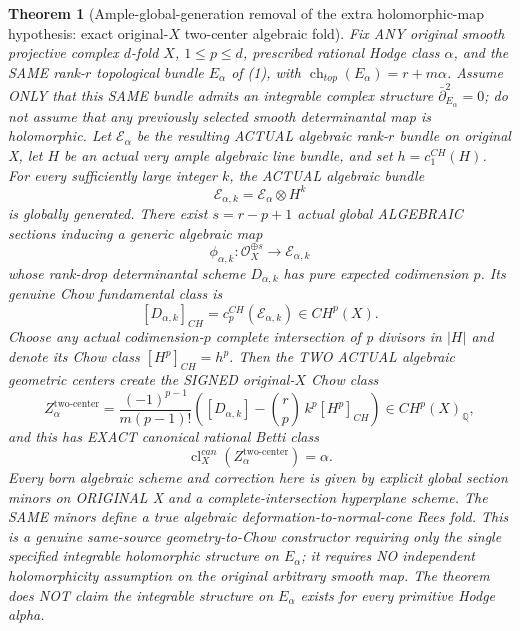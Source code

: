 \documentclass[11pt]{article}
\newtheorem{theorem}{Theorem}
\begin{document}
\begin{theorem}[Ample-global-generation removal of the extra holomorphic-map hypothesis: exact original-$X$ two-center algebraic fold]
Fix ANY original smooth projective
complex $d$-fold $X$, $1\le p\le d$,
prescribed rational Hodge class
$\alpha$, and the SAME rank-$r$
topological bundle $E_\alpha$
of (1), with
$\operatorname{ch}_{top}(E_\alpha)
=r+m\alpha$.
Assume ONLY that this SAME
bundle admits an integrable
complex structure
$\bar\partial_{E_\alpha}^2=0$;
do not assume that any
previously selected smooth
determinantal map is holomorphic.
Let $\mathcal E_\alpha$ be the
resulting ACTUAL algebraic
rank-$r$ bundle on original X,
let $H$ be an actual very
ample algebraic line bundle,
and set $h=c_1^{CH}(H)$.
For every sufficiently large
integer $k$, the ACTUAL
algebraic bundle
\[
 \mathcal E_{\alpha,k}
       =\mathcal E_\alpha\otimes H^k
\]
is globally generated. There
exist $s=r-p+1$ actual global
ALGEBRAIC sections inducing
a generic algebraic map
\[
 \phi_{\alpha,k}:
   \mathcal O_X^{\oplus s}
           \longrightarrow\mathcal E_{\alpha,k}
\]
whose rank-drop determinantal
scheme $D_{\alpha,k}$
has pure expected codimension
$p$. Its genuine Chow
fundamental class is
\[
 \boxed{
 [D_{\alpha,k}]_{CH}
          =c_p^{CH}(\mathcal E_{\alpha,k})
       \in CH^p(X).
 }                                                    \tag{23}
\]
Choose any actual codimension-$p$
complete intersection of p divisors
in $|H|$ and denote its Chow
class $[H^p]_{CH}=h^p$.
Then the TWO ACTUAL algebraic
geometric centers create the
SIGNED original-$X$ Chow class
\[
 \boxed{
 Z_\alpha^{\mathrm{two\text{-}center}}
 =\frac{(-1)^{p-1}}{m(p-1)!}
   \left([D_{\alpha,k}]
     -\binom rp\,k^p[H^p]_{CH}\right)
          \in CH^p(X)_{\mathbb Q},
 }                                                    \tag{24}
\]
and this has EXACT canonical
rational Betti class
\[
 \boxed{
  \operatorname{cl}^{can}_X
       (Z_\alpha^{\mathrm{two\text{-}center}})
          =\alpha .
 }                                                    \tag{25}
\]
Every born algebraic scheme
and correction here is given
by explicit global section
minors on ORIGINAL X and a
complete-intersection
hyperplane scheme. The SAME
minors define a true
algebraic deformation-to-normal-cone
Rees fold. This is a genuine
same-source geom\-etry-to-Chow
constructor requiring only the
single specified integrable
holomorphic structure on
$E_\alpha$; it requires NO
independent holomorphicity
assumption on the original
arbitrary smooth map.
The theorem does NOT claim
the integrable structure on
$E_\alpha$ exists for every
primitive Hodge alpha.
\end{theorem}
\end{document}
